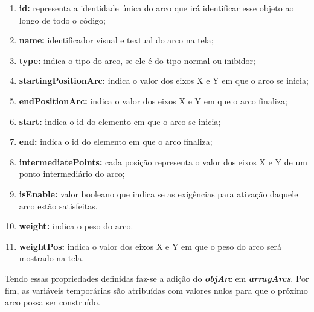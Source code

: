 \documentclass[
	12pt,				%
	openright,			%
	oneside,			%
	a4paper,			%
	english,			%
	brazil				%
	]{abntex2}
\begin{document}
\begin{enumerate}
	\item \textbf{id:} representa a identidade única do arco que irá identificar esse objeto ao longo de todo o código;
	\item \textbf{name:} identificador visual e textual do arco na tela;
	\item \textbf{type:} indica o tipo do arco, se ele é do tipo normal ou inibidor;
	\item \textbf{startingPositionArc:} indica o valor dos eixos X e Y em que o arco se inicia;
	\item \textbf{endPositionArc:} indica o valor dos eixos X e Y em que o arco finaliza;
	\item \textbf{start:} indica o id do elemento em que o arco se inicia;
	\item \textbf{end:} indica o id do elemento em que o arco finaliza;
	\item \textbf{intermediatePoints:} cada posição representa o valor dos eixos X e Y de um ponto intermediário do arco;
	\item \textbf{isEnable:} valor booleano que indica se as exigências para ativação daquele arco estão satisfeitas.
	\item \textbf{weight:} indica o peso do arco.
	\item \textbf{weightPos:} indica o valor dos eixos X e Y em que o peso do arco será mostrado na tela.
\end{enumerate}

Tendo essas propriedades definidas faz-se a adição do \textbf{\textit{objArc}} em \textbf{\textit{arrayArcs}}. Por fim, as variáveis temporárias são atribuídas com valores nulos para que o próximo arco possa ser construído.


\end{document}
